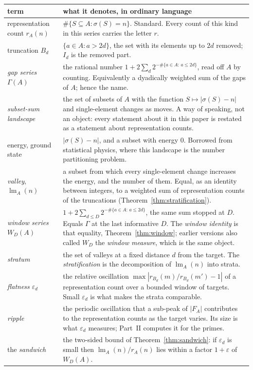 \documentclass[11pt,a4paper]{article}
\theoremstyle{plain}
\theoremstyle{definition}
\theoremstyle{remark}
\DeclareMathOperator{\lm}{lm}
\begin{document}
\begin{table}[htbp]
\centering
\small
\begin{tabular}{@{}p{3.5cm}p{9.3cm}@{}}
\toprule
term & what it denotes, in ordinary language\\
\midrule
representation count $r_A(n)$ & $\#\{S\subseteq A:\sigma(S)=n\}$. Standard. Every count
of this kind in this series carries the letter $r$.\\[3pt]
truncation $B_d$ & $\{a\in A:a>2d\}$, the set with its elements up to $2d$ removed;
$I_d$ is the removed part.\\[3pt]
\emph{gap series} $\Gamma(A)$ & the rational number
$1+2\sum_{d}2^{-\#\{a\in A:\,a\le2d\}}$, read off $A$ by counting. Equivalently a
dyadically weighted sum of the gaps of $A$; hence the name.\\[3pt]
\emph{subset-sum landscape} & the set of subsets of $A$ with the function
$S\mapsto|\sigma(S)-n|$ and single-element changes as moves. A way of speaking, not an
object: every statement about it in this paper is restated as a statement about
representation counts.\\[3pt]
energy, ground state & $|\sigma(S)-n|$, and a subset with energy $0$. Borrowed from
statistical physics, where this landscape is the number partitioning problem.\\[3pt]
\emph{valley}, $\lm_A(n)$ & a subset from which every single-element change increases
the energy, and the number of them. Equal, as an identity between integers, to a
weighted sum of representation counts of the truncations
(Theorem~\ref{thm:stratification}).\\[3pt]
\emph{window series} $W_D(A)$ & $1+2\sum_{d\le D}2^{-\#\{a\in A:\,a\le2d\}}$, the same sum
stopped at $D$. Equals $\Gamma$ at the last informative $D$. The
\emph{window identity} is that equality, Theorem~\ref{thm:window}; earlier versions also
called $W_D$ the \emph{window measure}, which is the same object.\\[3pt]
\emph{stratum} & the set of valleys at a fixed distance $d$ from the target. The
\emph{stratification} is the decomposition of $\lm_A(n)$ into strata.\\[3pt]
\emph{flatness} $\varepsilon_d$ & the relative oscillation
$\max|r_{B_d}(m)/r_{B_d}(m')-1|$ of a representation count over a bounded window of
targets. Small $\varepsilon_d$ is what makes the strata comparable.\\[3pt]
\emph{ripple} & the periodic oscillation that a sub-peak of $|F_A|$ contributes to the
representation counts as the target varies. Its size is what $\varepsilon_d$ measures;
Part~II computes it for the primes.\\[3pt]
the \emph{sandwich} & the two-sided bound of Theorem~\ref{thm:sandwich}: if
$\varepsilon_d$ is small then $\lm_A(n)/r_A(n)$ lies within a factor $1+\varepsilon$ of
$W_D(A)$.\\
\bottomrule
\end{tabular}
\end{table}
\end{document}
